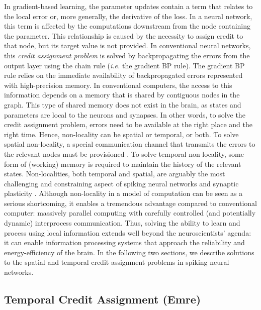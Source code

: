 \documentclass[journal,onecolumn,11pt]{IEEEtran}
\begin{document}
In gradient-based learning, the parameter updates contain a term that relates to the local error or, more generally, the derivative of the loss.
In a neural network, this term is affected by the computations downstream from the node containing the parameter.
This relationship is caused by the necessity to assign credit to that node, but its target value is not provided.
In conventional neural networks, this \emph{credit assignment problem} is solved by backpropagating the errors from the output layer using the chain rule (\emph{i.e.} the gradient BP rule).
The gradient BP rule relies on the immediate availability of backpropagated errors represented with high-precision memory.
In conventional computers, the access to this information depends on a memory that is shared by contiguous nodes in the graph.
This type of shared memory does not exist in the brain, as states and parameters are local to the neurons and synapses.
In other words, to solve the credit assignment problem, errors need to be available at the right place and the right time. 
Hence, non-locality can be spatial or temporal, or both.
To solve spatial non-locality, a special communication channel that transmits the errors to the relevant nodes must be provisioned \cite{Baldi_Sadowski16_theoloca}. 
To solve temporal non-locality, some form of (working) memory is required to maintain the history of the relevant states. 
Non-localities, both temporal and spatial, are arguably the most challenging and constraining aspect of spiking neural networks and synaptic plasticity \cite{Neftci18_datapowe}. 
Although non-locality in a model of computation can be seen as a serious shortcoming, it enables a tremendous advantage compared to conventional computer: massively parallel computing with carefully controlled (and potentially dynamic) interprocess communication. 
Thus, solving the ability to learn and process using local information extends well beyond the neuroscientists' agenda: it can enable information processing systems that approach the reliability and energy-efficiency of the brain.
In the following two sections, we describe solutions to the spatial and temporal credit assignment problems in spiking neural networks.

\subsection{Temporal Credit Assignment (Emre)}\label{sec:temporal_CA}
\end{document}

